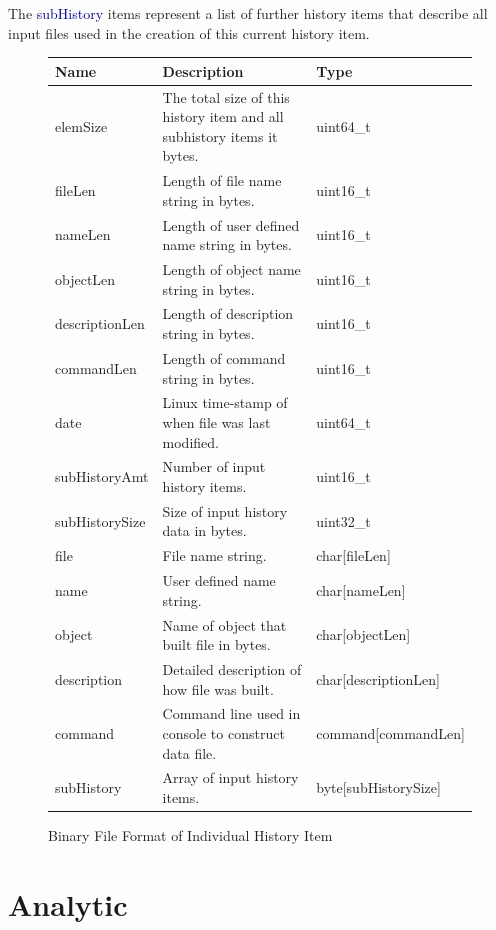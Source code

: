 \documentclass[10pt]{article}
\providecommand{\h}[1]{\textcolor{darkblue}{#1}}
\begin{document}
The \h{subHistory} items represent a list of further history items that 
describe all input files used in the creation of this current history item.

\begin{figure}[H]
\begin{mdframed}[style=btable]
\begin{tabularx}{\textwidth}{|l|X|l|}
\hline
\textbf{Name} & \textbf{Description} & \textbf{Type} \\
\hline
elemSize & The total size of this history item and all subhistory items it 
bytes. & uint64\_t \\
\hline
fileLen & Length of file name string in bytes. & uint16\_t \\
\hline
nameLen & Length of user defined name string in bytes. & uint16\_t \\
\hline
objectLen & Length of object name string in bytes. & uint16\_t \\
\hline
descriptionLen & Length of description string in bytes. & uint16\_t \\
\hline
commandLen & Length of command string in bytes. & uint16\_t \\
\hline
date & Linux time-stamp of when file was last modified. & uint64\_t \\
\hline
subHistoryAmt & Number of input history items. & uint16\_t \\
\hline
subHistorySize & Size of input history data in bytes. & uint32\_t \\
\hline
file & File name string. & char[fileLen] \\
\hline
name & User defined name string. & char[nameLen] \\
\hline
object & Name of object that built file in bytes. & char[objectLen] \\
\hline
description & Detailed description of how file was built. & 
char[descriptionLen] \\
\hline
command & Command line used in console to construct data file. & 
command[commandLen] \\
\hline
subHistory & Array of input history items. & byte[subHistorySize] \\
\hline
\end{tabularx}
\end{mdframed}
\caption{Binary File Format of Individual History Item}
\label{fig:kincdata:history}
\end{figure}

\newpage
\section{Analytic}
\end{document}
